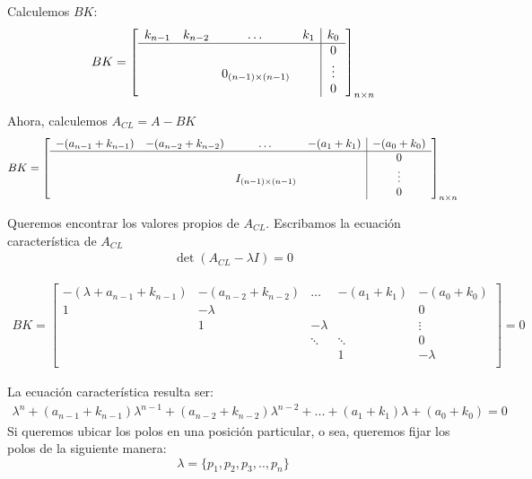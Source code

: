 Calculemos $BK$:
\begin{align*}
{BK}=\left[
    \begin{array}{cccc|c}
     k_{n-1} & k_{n-2} & \dots & k_1 & k_0\\ \hline
      & & & & 0\\
      & & {0}_{(n-1)\times(n-1)} & & \vdots\\
      & & & & 0  
    \end{array}\right]_{n\times n}
\end{align*}

Ahora, calculemos $A_{CL}=A-BK$
\begin{align*}
{BK}=\left[
    \begin{array}{cccc|c}
     -(a_{n-1}+k_{n-1}) & -(a_{n-2}+k_{n-2}) & \dots & -(a_1+k_1) & -(a_0+k_0)\\ \hline
      & & & & 0\\
      & & {I}_{(n-1)\times(n-1)} & & \vdots\\
      & & & & 0  
    \end{array}\right]_{n\times n}
\end{align*}

Queremos encontrar los valores propios de $A_{CL}$. Escribamos la ecuación característica de $A_{CL}$
\begin{align*}
    \det({A_{CL}}-\lambda {I})=0
\end{align*}

\begin{align*}
{BK}=\left[
    \begin{array}{cccc|c}
     -(\lambda+a_{n-1}+k_{n-1}) & -(a_{n-2}+k_{n-2}) & \dots & -(a_1+k_1) & -(a_0+k_0)\\ \hline
      1 & -\lambda & & & 0\\
      & 1 & -\lambda & & \vdots\\
      & & \ddots & \ddots & 0\\
      & & & 1 & -\lambda\\
    \end{array}\right]=0
\end{align*}

La ecuación característica resulta ser:
\begin{align*}
    \lambda^n+(a_{n-1}+k_{n-1})\lambda^{n-1}+(a_{n-2}+k_{n-2})\lambda^{n-2}+...+(a_{1}+k_{1})\lambda+(a_{0}+k_{0})=0
\end{align*}
Si queremos ubicar los polos en una posición particular, o sea, queremos fijar los polos de la siguiente manera:
$$ \lambda=\{p_1,p_2,p_3,..,p_n \}$$

